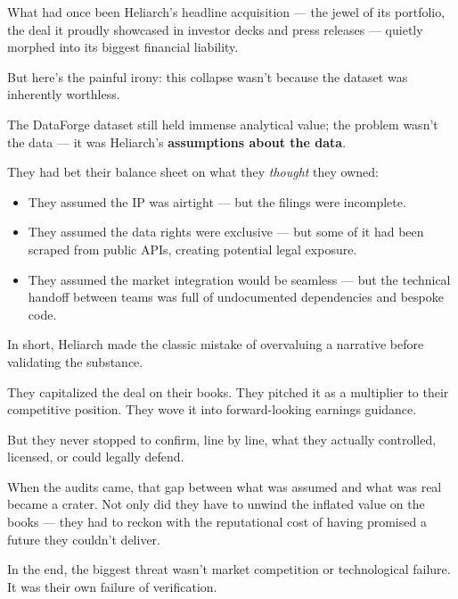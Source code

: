 What had once been Heliarch’s headline acquisition — the jewel of its portfolio, the deal it proudly showcased in investor decks and press releases — quietly morphed into its biggest financial liability.

But here’s the painful irony:
this collapse wasn’t because the dataset was inherently worthless.

The DataForge dataset still held immense analytical value; the problem wasn’t the data — it was Heliarch’s \textbf{assumptions about the data}.

They had bet their balance sheet on what they \textit{thought} they owned:

\begin{itemize}
\item They assumed the IP was airtight — but the filings were incomplete.
\item They assumed the data rights were exclusive — but some of it had been scraped from public APIs, creating potential legal exposure.
\item They assumed the market integration would be seamless — but the technical handoff between teams was full of undocumented dependencies and bespoke code.
\end{itemize}

In short, Heliarch made the classic mistake of overvaluing a narrative before validating the substance.

They capitalized the deal on their books.
They pitched it as a multiplier to their competitive position.
They wove it into forward-looking earnings guidance.

But they never stopped to confirm, line by line, what they actually controlled, licensed, or could legally defend.

When the audits came, that gap between what was assumed and what was real became a crater.
Not only did they have to unwind the inflated value on the books —
they had to reckon with the reputational cost of having promised a future they couldn’t deliver.

In the end, the biggest threat wasn’t market competition or technological failure.
It was their own failure of verification.

